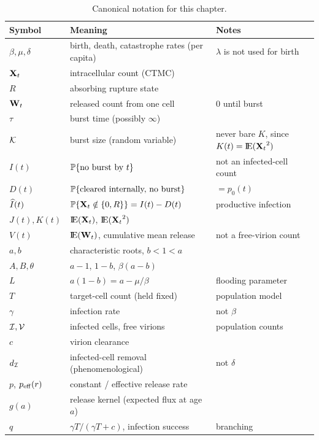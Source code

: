 \begin{table}[H]
\centering
\renewcommand{\arraystretch}{1.25}
\small
\begin{tabular}{@{}llp{}@{}}
\toprule
Symbol & Meaning & Notes \\
\midrule
$\beta,\mu,\delta$ & birth, death, catastrophe rates (per capita) & $\lambda$ is not used for birth \\
${{\bf X}_t}$ & intracellular count (CTMC) & \\
$R$ & absorbing rupture state & \\
${{\bf W}_t}$ & released count from one cell & $0$ until burst \\
$\tau$ & burst time (possibly $\infty$) & \\
$\mathcal{K}$ & burst size (random variable) & never bare $K$, since $K(t)={\rm I}\!{\rm E}({{\bf X}_t}^2)$ \\
$I(t)$ & $\mathbb{P}\!\left\{\text{no burst by }t\right\}$ & not an infected-cell count \\
$D(t)$ & $\mathbb{P}\!\left\{\text{cleared internally, no burst}\right\}$ & $= p_0(t)$ \\
$\widehat{I}(t)$ & $\mathbb{P}\!\left\{{{\bf X}_t}\notin\{0,R\}\right\} = I(t)-D(t)$ & productive infection \\
$J(t),K(t)$ & ${\rm I}\!{\rm E}({{\bf X}_t})$, ${\rm I}\!{\rm E}({{\bf X}_t}^2)$ & \\
$V(t)$ & ${\rm I}\!{\rm E}({{\bf W}_t})$, cumulative mean release & not a free-virion count \\
$a,b$ & characteristic roots, $b<1<a$ & \\
$A,B,\theta$ & $a-1$, $1-b$, $\beta(a-b)$ & \\
$L$ & $a(1-b)=a-\mu/\beta$ & flooding parameter \\
$T$ & target-cell count (held fixed) & population model \\
$\gamma$ & infection rate & not $\beta$ \\
$\mathcal{I},\mathcal{V}$ & infected cells, free virions & population counts \\
$c$ & virion clearance & \\
$d_{\mathcal{I}}$ & infected-cell removal (phenomenological) & not $\delta$ \\
$p$, $p_{\rm eff}(r)$ & constant / effective release rate & \\
$g(a)$ & release kernel (expected flux at age $a$) & \\
$q$ & $\gamma T/(\gamma T+c)$, infection success & branching \\
\bottomrule
\end{tabular}
\caption{Canonical notation for this chapter.}
\label{tab:notation}
\end{table}

